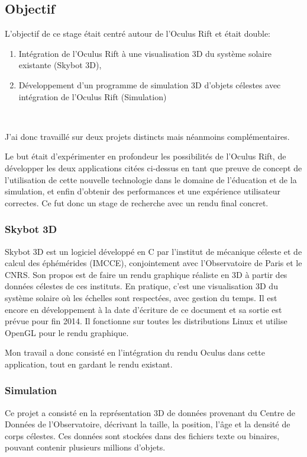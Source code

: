 \documentclass[a4paper,french,12pt]{article}
\begin{document}
	\subsection{Objectif}	
	
		L’objectif de ce stage était centré autour de l'Oculus Rift et était double:\\
		
		\begin{enumerate}
		\item Intégration de l'Oculus Rift à une visualisation 3D du système solaire existante (Skybot 3D),
		\item Développement d'un programme de simulation 3D  d'objets célestes avec intégration de l'Oculus Rift (Simulation)
		\end{enumerate}~
		
		J'ai donc travaillé sur deux projets distincts mais néanmoins complémentaires.
		
		Le but était d'expérimenter en profondeur les possibilités de l'Oculus Rift, de développer 
		les deux applications citées ci-dessus en tant que preuve de concept de l'utilisation de cette nouvelle technologie
		dans le domaine de l'éducation et de la simulation, et enfin d'obtenir des performances et une expérience
		utilisateur correctes. Ce fut donc un stage de recherche avec un rendu final concret.
		
	    \subsubsection{Skybot 3D}
		Skybot 3D est un logiciel développé en C par l'institut de mécanique céleste et de calcul des éphémérides (IMCCE),
		conjointement avec l'Observatoire de Paris et le CNRS. Son propos est de faire un rendu graphique réaliste
		en 3D à partir des données célestes de ces instituts. En pratique, c'est une visualisation 3D du système solaire
		où les échelles sont respectées, avec gestion du temps. Il est encore en développement à la date d'écriture de ce document et
		sa sortie est prévue pour fin 2014.
		Il fonctionne sur toutes les distributions Linux et utilise OpenGL pour le rendu graphique.
		
		Mon travail a donc consisté en l'intégration du rendu Oculus dans cette application, tout en gardant
		le rendu existant.
		
	    \subsubsection{Simulation}
		Ce projet a consisté en la représentation 3D de données provenant du Centre de Données
		de l'Observatoire, décrivant la taille, la position, l'âge et la densité de corps célestes.
		Ces données sont stockées dans des fichiers texte ou binaires, pouvant contenir plusieurs millions
		d'objets.
		
\end{document}
